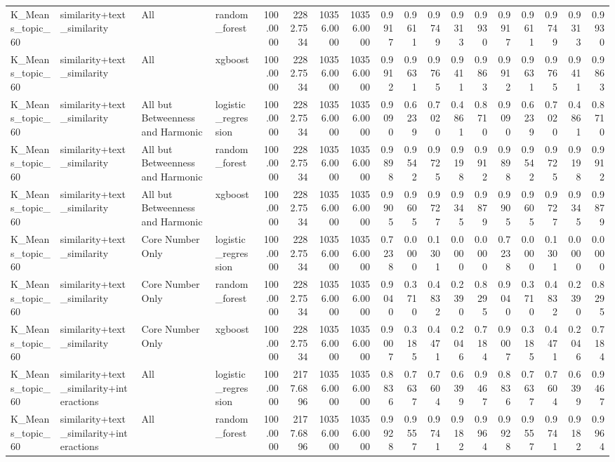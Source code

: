 \begin{tabular}{llllrrrrrrrrrrrrrr}
K_Means_topic_60 & similarity+text_similarity & All & random_forest & 100.0000 & 2282.7534 & 10356.0000 & 10356.0000 & 0.9917 & 0.9611 & 0.9749 & 0.9313 & 0.9930 & 0.9917 & 0.9611 & 0.9749 & 0.9313 & 0.9930 \\
K_Means_topic_60 & similarity+text_similarity & All & xgboost & 100.0000 & 2282.7534 & 10356.0000 & 10356.0000 & 0.9912 & 0.9631 & 0.9765 & 0.9411 & 0.9863 & 0.9912 & 0.9631 & 0.9765 & 0.9411 & 0.9863 \\
K_Means_topic_60 & similarity+text_similarity & All but Betweenness and Harmonic & logistic_regression & 100.0000 & 2282.7534 & 10356.0000 & 10356.0000 & 0.9090 & 0.6239 & 0.7020 & 0.4861 & 0.8710 & 0.9090 & 0.6239 & 0.7020 & 0.4861 & 0.8710 \\
K_Means_topic_60 & similarity+text_similarity & All but Betweenness and Harmonic & random_forest & 100.0000 & 2282.7534 & 10356.0000 & 10356.0000 & 0.9898 & 0.9542 & 0.9725 & 0.9198 & 0.9912 & 0.9898 & 0.9542 & 0.9725 & 0.9198 & 0.9912 \\
K_Means_topic_60 & similarity+text_similarity & All but Betweenness and Harmonic & xgboost & 100.0000 & 2282.7534 & 10356.0000 & 10356.0000 & 0.9905 & 0.9605 & 0.9727 & 0.9345 & 0.9879 & 0.9905 & 0.9605 & 0.9727 & 0.9345 & 0.9879 \\
K_Means_topic_60 & similarity+text_similarity & Core Number Only & logistic_regression & 100.0000 & 2282.7534 & 10356.0000 & 10356.0000 & 0.7238 & 0.0000 & 0.1301 & 0.0000 & 0.0000 & 0.7238 & 0.0000 & 0.1301 & 0.0000 & 0.0000 \\
K_Means_topic_60 & similarity+text_similarity & Core Number Only & random_forest & 100.0000 & 2282.7534 & 10356.0000 & 10356.0000 & 0.9040 & 0.3710 & 0.4832 & 0.2390 & 0.8295 & 0.9040 & 0.3710 & 0.4832 & 0.2390 & 0.8295 \\
K_Means_topic_60 & similarity+text_similarity & Core Number Only & xgboost & 100.0000 & 2282.7534 & 10356.0000 & 10356.0000 & 0.9007 & 0.3185 & 0.4471 & 0.2046 & 0.7184 & 0.9007 & 0.3185 & 0.4471 & 0.2046 & 0.7184 \\
K_Means_topic_60 & similarity+text_similarity+interactions & All & logistic_regression & 100.0000 & 2177.6896 & 10356.0000 & 10356.0000 & 0.8836 & 0.7637 & 0.7604 & 0.6399 & 0.9467 & 0.8836 & 0.7637 & 0.7604 & 0.6399 & 0.9467 \\
K_Means_topic_60 & similarity+text_similarity+interactions & All & random_forest & 100.0000 & 2177.6896 & 10356.0000 & 10356.0000 & 0.9928 & 0.9557 & 0.9741 & 0.9182 & 0.9964 & 0.9928 & 0.9557 & 0.9741 & 0.9182 & 0.9964 \\

\end{tabular}

